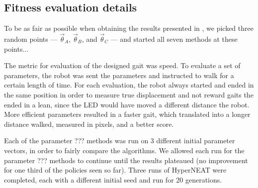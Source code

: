 \subsection{Fitness evaluation details}


To be as fair as possible when obtaining the results presented in
, we picked three random points --- $\vec{\theta}_A$,
$\vec{\theta}_B$, and $\vec{\theta}_C$ --- and started all seven
methods at these points...



The metric for evaluation of the designed gait was speed. To evaluate
a set of parameters, the robot was sent the parameters and instructed
to walk for a certain length of time. For each evaluation, the robot
always started and ended in the same position in order to measure true
displacement and not reward gaits the ended in a lean, since the LED
would have moved a different distance the robot. More efficient
parameters resulted in a faster gait, which translated into a longer
distance walked, measured in pixels, and a better score.

Each of the parameter ??? methods was run on 3 different initial
parameter vectors, in order to fairly compare the algorithms. We allowed 
each run for the parameter ??? methods to
continue until the results plateaued (no improvement for one third of
the policies seen so far). Three runs of HyperNEAT were completed,
each with a different initial seed and run for 20 generations.
